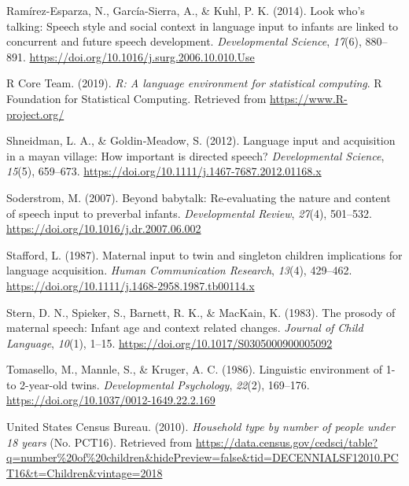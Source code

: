 \documentclass[
  english,
  man,floatsintext]{apa6}
\begin{document}
\leavevmode\hypertarget{ref-ramirez-esparza_look_2014}{}%
Ramírez-Esparza, N., García-Sierra, A., \& Kuhl, P. K. (2014). Look who's talking: Speech style and social context in language input to infants are linked to concurrent and future speech development. \emph{Developmental Science}, \emph{17}(6), 880--891. \url{https://doi.org/10.1016/j.surg.2006.10.010.Use}

\leavevmode\hypertarget{ref-r_core_team_r_2019}{}%
R Core Team. (2019). \emph{R: A language environment for statistical computing}. R Foundation for Statistical Computing. Retrieved from \url{https://www.R-project.org/}

\leavevmode\hypertarget{ref-shneidman_language_2012}{}%
Shneidman, L. A., \& Goldin‐Meadow, S. (2012). Language input and acquisition in a mayan village: How important is directed speech? \emph{Developmental Science}, \emph{15}(5), 659--673. \url{https://doi.org/10.1111/j.1467-7687.2012.01168.x}

\leavevmode\hypertarget{ref-soderstrom_beyond_2007}{}%
Soderstrom, M. (2007). Beyond babytalk: Re-evaluating the nature and content of speech input to preverbal infants. \emph{Developmental Review}, \emph{27}(4), 501--532. \url{https://doi.org/10.1016/j.dr.2007.06.002}

\leavevmode\hypertarget{ref-stafford_maternal_1987}{}%
Stafford, L. (1987). Maternal input to twin and singleton children implications for language acquisition. \emph{Human Communication Research}, \emph{13}(4), 429--462. \url{https://doi.org/10.1111/j.1468-2958.1987.tb00114.x}

\leavevmode\hypertarget{ref-stern_prosody_1983}{}%
Stern, D. N., Spieker, S., Barnett, R. K., \& MacKain, K. (1983). The prosody of maternal speech: Infant age and context related changes. \emph{Journal of Child Language}, \emph{10}(1), 1--15. \url{https://doi.org/10.1017/S0305000900005092}

\leavevmode\hypertarget{ref-tomasello_linguistic_1986}{}%
Tomasello, M., Mannle, S., \& Kruger, A. C. (1986). Linguistic environment of 1- to 2-year-old twins. \emph{Developmental Psychology}, \emph{22}(2), 169--176. \url{https://doi.org/10.1037/0012-1649.22.2.169}

\leavevmode\hypertarget{ref-united_states_census_bureau_household_2010}{}%
United States Census Bureau. (2010). \emph{Household type by number of people under 18 years} (No. PCT16). Retrieved from \url{https://data.census.gov/cedsci/table?q=number\%20of\%20children\&hidePreview=false\&tid=DECENNIALSF12010.PCT16\&t=Children\&vintage=2018}
\end{document}
